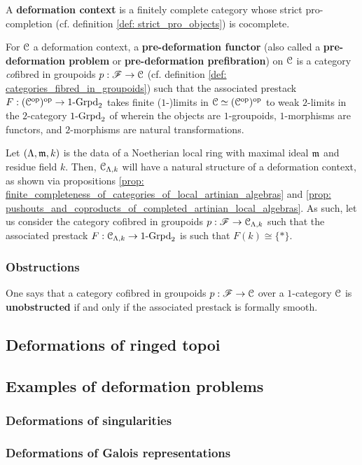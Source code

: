             \begin{definition} \label{def: deformation_context}
                A \textbf{deformation context} is a finitely complete category whose strict pro-completion (cf. definition \ref{def: strict_pro_objects}) is cocomplete. 
            \end{definition}
            \begin{definition} \label{def: pre_deformation_functors}
                For $\mathcal{C}$ a deformation context, a \textbf{pre-deformation functor} (also called a \textbf{pre-deformation problem} or \textbf{pre-deformation prefibration}) on $\mathcal{C}$ is a category \textit{co}fibred in groupoids $p: \mathscr{F} \to \mathcal{C}$ (cf. definition \ref{def: categories_fibred_in_groupoids}) such that the associated prestack $F: (\mathcal{C}^{\mathrm{op}})^{\mathrm{op}} \to 1\text{-}\mathrm{Grpd}_2$ takes finite ($1$-)limits in $\mathcal{C} \simeq (\mathcal{C}^{\mathrm{op}})^{\mathrm{op}}$ to weak $2$-limits in the $2$-category $1\text{-}\mathrm{Grpd}_2$ of wherein the objects are $1$-groupoids, $1$-morphisms are functors, and $2$-morphisms are natural transformations.
            \end{definition}
            \begin{example}
                Let $(\Lambda, \mathfrak{m}, k)$ is the data of a Noetherian local ring with maximal ideal $\mathfrak{m}$ and residue field $k$. Then, $\mathcal{C}_{\Lambda, k}$ will have a natural structure of a deformation context, as shown via propositions \ref{prop: finite_completeness_of_categories_of_local_artinian_algebras} and \ref{prop: pushouts_and_coproducts_of_completed_artinian_local_algebras}. As such, let us consider the category cofibred in groupoids $p: \mathscr{F} \to \mathcal{C}_{\Lambda, k}$ such that the associated prestack $F: \mathcal{C}_{\Lambda, k} \to 1\text{-}\mathrm{Grpd}_2$ is such that $F(k) \cong \{*\}$.
            \end{example}
    
        \subsubsection{Obstructions}
            \begin{definition}
                One says that a category cofibred in groupoids $p: \mathscr{F} \to \mathcal{C}$ over a $1$-category $\mathcal{C}$ is \textbf{unobstructed} if and only if the associated prestack is formally smooth. 
            \end{definition}
        
    \subsection{Deformations of ringed topoi}
    
    \subsection{Examples of deformation problems}
        \subsubsection{Deformations of singularities}
        
        \subsubsection{Deformations of Galois representations}
